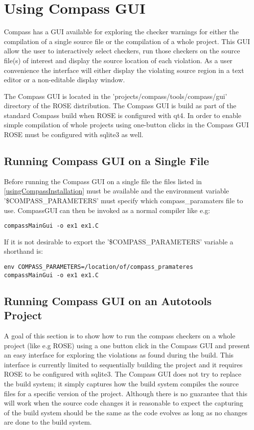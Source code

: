 \chapter{Using Compass GUI}

Compass has a GUI available for exploring the checker warnings for either the compilation
of a single source file or the compilation of a whole project. This GUI allow the user to
interactively select checkers, run those checkers on the source file(s) of 
interest and display the source location of each violation. As a user convenience the
interface will either display the violating source region in a text editor or a 
non-editable display window.

The Compass GUI is located in the 'projects/compass/tools/compass/gui' directory of the
ROSE distribution. The Compass GUI is build as part of the standard Compass build when
ROSE is configured with qt4. In order to enable simple compilation of whole projects using
one-button clicks in the Compass GUI ROSE must be configured with sqlite3 as well.

\section{Running Compass GUI on a Single File}

Before running the Compass GUI on a single file  the files listed 
in \ref{usingCompassInstallation} must be available and the environment variable 
'\$COMPASS\_PARAMETERS' must specify which compass\_paramaters file to use. CompassGUI can
then be invoked as a normal compiler like e.g:
\begin{verbatim}
compassMainGui -o ex1 ex1.C
\end{verbatim}
If it is not desirable to export the '\$COMPASS\_PARAMETERS' variable a shorthand is:
\begin{verbatim}
env COMPASS_PARAMETERS=/location/of/compass_pramateres   compassMainGui -o ex1 ex1.C
\end{verbatim}

\section{Running Compass GUI on an Autotools Project}

A goal of this section is to show how to run the compass checkers on a whole project (like e.g ROSE) 
using a one button click in the Compass GUI and present an easy interface for exploring the violations
as found during the build. This interface is currently limited to sequentially building the
project and it requires ROSE to be configured with sqlite3. The Compass GUI does not try to replace the 
build system; it simply captures how the build system compiles the source files for a specific version of the 
project. Although there is no guarantee that this will work when the source code changes it is reasonable to 
expect the capturing of the build system should be the same as the code evolves as long as no changes are done 
to the build system.

